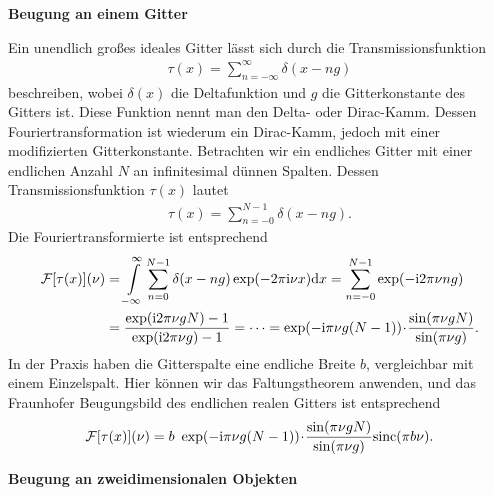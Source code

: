 \textbf{Beugung an einem Gitter}

Ein unendlich großes ideales Gitter lässt sich durch die Transmissionsfunktion
\begin{align}
\tau(x)=\sum\limits_{n=-\infty}^\infty \delta(x-ng)
\end{align}
beschreiben, wobei $\delta(x)$ die Deltafunktion und $g$ die Gitterkonstante des Gitters ist. Diese Funktion nennt man den Delta- oder Dirac-Kamm. Dessen Fouriertransformation ist wiederum ein Dirac-Kamm, jedoch mit einer modifizierten Gitterkonstante.
Betrachten wir ein endliches Gitter mit einer endlichen Anzahl $N$ an infinitesimal dünnen Spalten. Dessen Transmissionsfunktion $\tau(x)$ lautet
\begin{align}
\tau(x)=\sum\limits_{n=-0}^{N-1} \delta(x-ng).
\end{align}
Die Fouriertransformierte ist entsprechend
\begin{align}
\mathcal{F}[\tau(x)](\nu)&=\int\limits_{-\infty}^{\infty}\sum\limits_{n=0}^{N-1} \delta(x-ng)\exp(-2\pi\mathrm{i}\nu x)\mathrm{d} x=\sum\limits_{n=-0}^{N-1}\exp(-\mathrm{i}2\pi\nu ng)\nonumber\\
&=\frac{\exp(\mathrm{i}2\pi\nu gN)-1}{\exp(\mathrm{i}2\pi\nu g)-1}=\dots =\exp(-\mathrm{i}\pi\nu g(N-1))\!\cdot\! \frac{\sin(\pi\nu gN)}{\sin(\pi\nu g)}.
\end{align}
In der Praxis haben die Gitterspalte eine endliche Breite $b$, vergleichbar mit einem Einzelspalt. Hier können wir das Faltungstheorem anwenden, und das Fraunhofer Beugungsbild des endlichen realen Gitters ist entsprechend
\begin{align}
\mathcal{F}[\tau(x)](\nu)=b~\exp(-\mathrm{i}\pi\nu g(N-1))\!\cdot\! \frac{\sin(\pi\nu gN)}{\sin(\pi\nu g)}\mathrm{sinc}(\pi b\nu).
\end{align}

\textbf{Beugung an zweidimensionalen Objekten}


